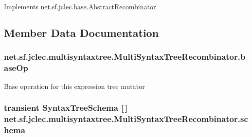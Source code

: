 Implements \hyperlink{classnet_1_1sf_1_1jclec_1_1base_1_1_abstract_recombinator_a49a445f27d777d6f439d97d61f2e1729}{net.\-sf.\-jclec.\-base.\-Abstract\-Recombinator}.



\subsection{Member Data Documentation}
\hypertarget{classnet_1_1sf_1_1jclec_1_1multisyntaxtree_1_1_multi_syntax_tree_recombinator_a396d948c7737fb581d398ccbd1515e83}{
\subsubsection[{base\-Op}]{ net.\-sf.\-jclec.\-multisyntaxtree.\-Multi\-Syntax\-Tree\-Recombinator.\-base\-Op\hspace{0.3cm}{\ttfamily [protected]}}}\label{classnet_1_1sf_1_1jclec_1_1multisyntaxtree_1_1_multi_syntax_tree_recombinator_a396d948c7737fb581d398ccbd1515e83}
Base operation for this expression tree mutator \hypertarget{classnet_1_1sf_1_1jclec_1_1multisyntaxtree_1_1_multi_syntax_tree_recombinator_a6590734a82ae7ddb9263ebfaf7613679}{
\subsubsection[{schema}]{\setlength{\rightskip}{0pt plus 5cm}transient {\bf Syntax\-Tree\-Schema} \mbox{[}$\,$\mbox{]} net.\-sf.\-jclec.\-multisyntaxtree.\-Multi\-Syntax\-Tree\-Recombinator.\-schema\hspace{0.3cm}{\ttfamily [protected]}}}\label{classnet_1_1sf_1_1jclec_1_1multisyntaxtree_1_1_multi_syntax_tree_recombinator_a6590734a82ae7ddb9263ebfaf7613679}
